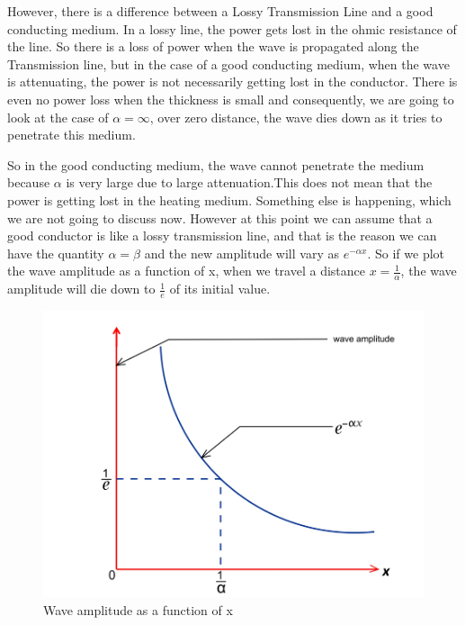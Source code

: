 However, there is a difference between a Lossy Transmission Line and a good conducting medium. In a lossy line, the power gets lost in the ohmic resistance of the line. So there is a loss of power when the wave is propagated along the Transmission line, but in the case of a good conducting medium, when the wave is attenuating, the power is not necessarily getting lost in the conductor. There is even no power loss when the thickness is small and consequently, we are going to look at the case of $\alpha=\infty$, over zero distance, the wave dies down as it tries to penetrate this medium.

So in the good conducting medium, the wave cannot penetrate the medium because $\alpha$ is very large due to large attenuation.This does not mean that the power is getting lost in the heating medium. Something else is happening, which we are not going to discuss now. However at this point we can assume that a good conductor is like a lossy transmission line, and that is the reason we can have the quantity $\alpha=\beta$ and the new amplitude will vary as $e^{-\alpha x}$. So if we plot the wave amplitude as a function of x, when we travel a distance $x=\frac{1}{\alpha}$, the wave amplitude will die down to $\frac{1}{e}$ of its initial value.
\begin{figure}[h]
\centering
\includegraphics[width=0.9\linewidth]{./graphics/wave_amplitude_as_function_of_x}
\caption{Wave amplitude as a function of x}
\label{fig:bello261}
\end{figure}

